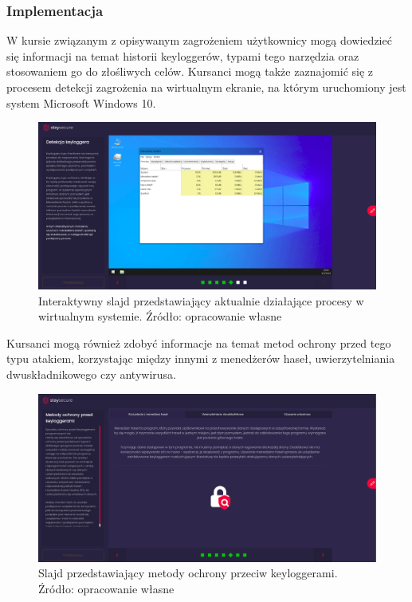 \documentclass[12pt,twoside]{article}
\begin{document}
\subsubsection{Implementacja}

W kursie związanym z opisywanym zagrożeniem użytkownicy mogą dowiedzieć się informacji na temat historii keyloggerów, typami tego narzędzia oraz stosowaniem go do złośliwych celów. Kursanci mogą także zaznajomić się z procesem detekcji zagrożenia na wirtualnym ekranie, na którym uruchomiony jest system Microsoft Windows 10. 

\begin{figure}[H]
	\centering
	\includegraphics[width=1\linewidth]{figures/keylogger-slide-screenshot1}
	\caption{Interaktywny slajd przedstawiający aktualnie działające procesy w wirtualnym systemie. Źródło: opracowanie własne}
\end{figure}

Kursanci mogą również zdobyć informacje na temat metod ochrony przed tego typu atakiem, korzystając między innymi z menedżerów haseł, uwierzytelniania dwuskładnikowego czy antywirusa.

\begin{figure}[H]
	\centering
	\includegraphics[width=1\linewidth]{figures/keylogger-slide-screenshot2}
	\caption{Slajd przedstawiający metody ochrony przeciw keyloggerami. Źródło: opracowanie własne}
\end{figure}
\end{document}
